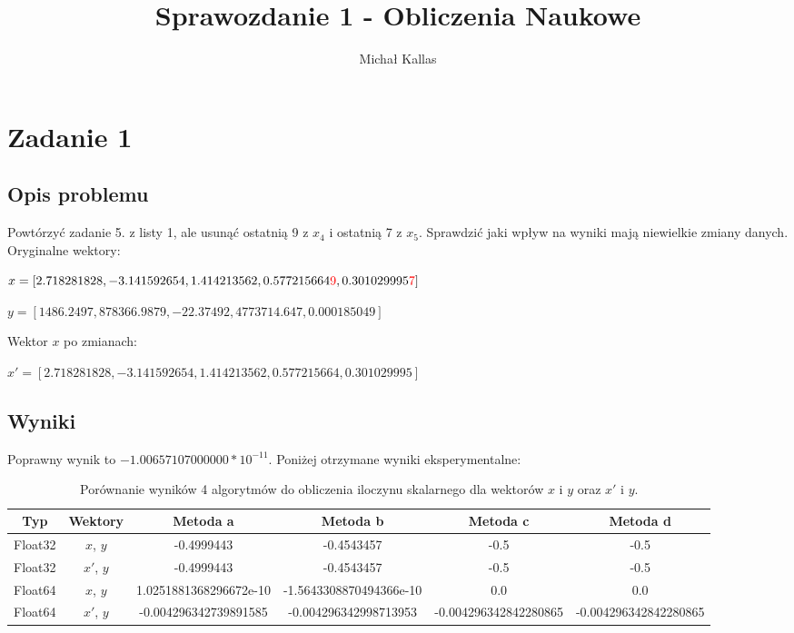 \documentclass{article}
\title{Sprawozdanie 1 - Obliczenia Naukowe}
\author{Michał Kallas}
\begin{document}
\maketitle

\section{Zadanie 1}
\subsection{Opis problemu}
Powtórzyć zadanie 5. z listy 1, ale usunąć ostatnią 9 z $x_4$ i ostatnią 7 z $x_5$. Sprawdzić jaki wpływ na wyniki mają
niewielkie zmiany danych.\\

\noindent Oryginalne wektory:

\begin{description}
    \item $x = [2.718281828, -3.141592654, 1.414213562, 0.577215664\textcolor{red}{9}, 0.301029995\textcolor{red}{7}]$
    \item $y = [1486.2497, 878366.9879, -22.37492, 4773714.647, 0.000185049]$
\end{description}

\noindent Wektor $x$ po zmianach:

\begin{description}
    \item $x' = [2.718281828, -3.141592654, 1.414213562, 0.577215664, 0.301029995]$
\end{description}

\subsection{Wyniki}
Poprawny wynik to $-1.00657107000000 * 10^{-11}$. Poniżej otrzymane wyniki eksperymentalne:

\begin{table}[H]
\begin{adjustbox}{center}
\begin{tabular}{|c|c|c|c|c|c|}
    \hline
    Typ & Wektory & Metoda a & Metoda b & Metoda c & Metoda d\\
    \hline
    Float32 & $x$, $y$ & -0.4999443 & -0.4543457 & -0.5 & -0.5\\
    \hline
    Float32 & $x'$, $y$ & -0.4999443 & -0.4543457 & -0.5 & -0.5\\
    \hline
    Float64 & $x$, $y$ & 1.0251881368296672e-10 & -1.5643308870494366e-10 & 0.0 & 0.0\\
    \hline
    Float64 & $x'$, $y$ & -0.004296342739891585 & -0.004296342998713953 & -0.004296342842280865 & -0.004296342842280865\\
    \hline
\end{tabular}
\end{adjustbox}
\caption{Porównanie wyników 4 algorytmów do obliczenia iloczynu skalarnego dla wektorów $x$ i $y$ oraz $x'$ i $y$.}
\end{table}
\end{document}

